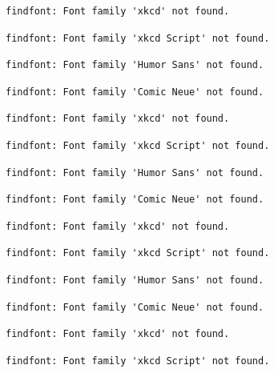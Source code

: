 \documentclass[
  letterpaper,
  DIV=11,
  numbers=noendperiod]{scrartcl}
\begin{document}
\begin{verbatim}
findfont: Font family 'xkcd' not found.
\end{verbatim}

\begin{verbatim}
findfont: Font family 'xkcd Script' not found.
\end{verbatim}

\begin{verbatim}
findfont: Font family 'Humor Sans' not found.
\end{verbatim}

\begin{verbatim}
findfont: Font family 'Comic Neue' not found.
\end{verbatim}

\begin{verbatim}
findfont: Font family 'xkcd' not found.
\end{verbatim}

\begin{verbatim}
findfont: Font family 'xkcd Script' not found.
\end{verbatim}

\begin{verbatim}
findfont: Font family 'Humor Sans' not found.
\end{verbatim}

\begin{verbatim}
findfont: Font family 'Comic Neue' not found.
\end{verbatim}

\begin{verbatim}
findfont: Font family 'xkcd' not found.
\end{verbatim}

\begin{verbatim}
findfont: Font family 'xkcd Script' not found.
\end{verbatim}

\begin{verbatim}
findfont: Font family 'Humor Sans' not found.
\end{verbatim}

\begin{verbatim}
findfont: Font family 'Comic Neue' not found.
\end{verbatim}

\begin{verbatim}
findfont: Font family 'xkcd' not found.
\end{verbatim}

\begin{verbatim}
findfont: Font family 'xkcd Script' not found.
\end{verbatim}
\end{document}
